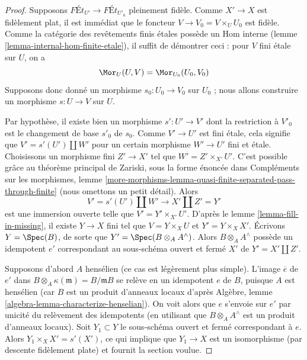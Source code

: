 \begin{proof}
Supposons $\textit{F\'Et}_{U'} \longrightarrow \textit{F\'Et}_{U'_0}$
pleinement fidèle. Comme $X' \to X$ est fidèlement plat, il est
immédiat que le foncteur $V \to V_0 = V \times_U U_0$ est fidèle.
Comme la catégorie des revêtements finis étales possède un Hom interne
(lemme \ref{lemma-internal-hom-finite-etale}),
il suffit de démontrer ceci : pour $V$ fini étale sur $U$,
on a
$$
\Mor_U(U, V) = \Mor_{U_0}(U_0, V_0)
$$
Supposons donc donné un morphisme $s_0 : U_0 \to V_0$ sur $U_0$ ; nous allons
construire un morphisme $s : U \to V$ sur $U$.

\medskip\noindent
Par hypothèse, il existe bien un morphisme $s' : U' \to V'$
dont la restriction à $V'_0$ est le changement de base $s'_0$ de $s_0$.
Comme $V' \to U'$ est fini étale, cela signifie que $V' = s'(U') \amalg W'$
pour un certain morphisme $W' \to U'$ fini et étale.
Choisissons un morphisme fini $Z' \to X'$ tel que $W' = Z' \times_{X'} U'$.
C'est possible grâce au théorème principal de Zariski, sous la forme énoncée dans
Compléments sur les morphismes, lemme
\ref{more-morphisms-lemma-quasi-finite-separated-pass-through-finite}
(nous omettons un petit détail).
Alors
$$
V' = s'(U') \amalg W' \longrightarrow X' \amalg Z' = Y'
$$
est une immersion ouverte telle que $V' = Y' \times_{X'} U'$.
D'après le lemme \ref{lemma-fill-in-missing}, il existe $Y \to X$ fini
tel que $V = Y \times_X U$ et $Y' = Y \times_X X'$.
Écrivons $Y = \Spec(B)$, de sorte que $Y' = \Spec(B \otimes_A A^\wedge)$.
Alors $B \otimes_A A^\wedge$ possède un idempotent $e'$
correspondant au sous-schéma ouvert et fermé $X'$ de $Y' = X' \amalg Z'$.

\medskip\noindent
Supposons d'abord $A$ hensélien (ce cas est légèrement plus simple). L'image $\overline{e}$
de $e'$ dans $B \otimes_A \kappa(\mathfrak m) = B/\mathfrak mB$ se relève en un
idempotent $e$ de $B$, puisque $A$ est hensélien (car $B$ est un produit d'anneaux
locaux d'après Algèbre, lemme \ref{algebra-lemma-characterize-henselian}).
On voit alors que $e$ s'envoie sur $e'$ par unicité du relèvement des idempotents
(en utilisant que $B \otimes_A A^\wedge$ est un produit d'anneaux locaux).
Soit $Y_1 \subset Y$ le sous-schéma ouvert et fermé correspondant à $e$.
Alors $Y_1 \times_X X' = s'(X')$, ce qui implique que $Y_1 \to X$ est
un isomorphisme (par descente fidèlement plate) et fournit la section voulue.


\end{proof}
